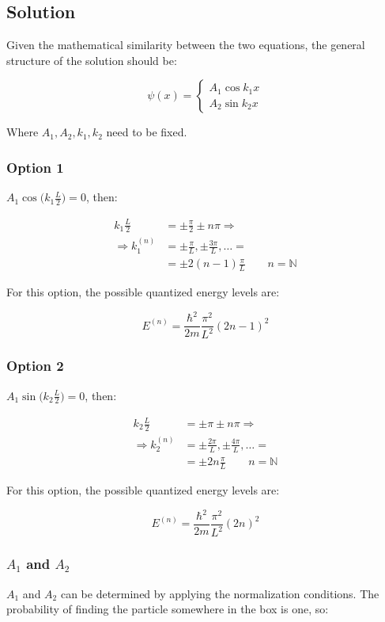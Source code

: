   \subsection{Solution}
  Given the mathematical similarity between the two equations, the general structure of the solution should be:

  $$\psi(x) = \begin{cases}A_1\cos k_1 x \\A_2\sin k_2x\end{cases}$$

  Where $A_1,A_2,k_1, k_2$ need to be fixed.

    \subsubsection{Option 1}
    $A_1\cos\biggl(k_1 \frac{L}{2}\biggr) = 0$, then:

    \begin{align*}
      k_1 \frac{L}{2} &=\pm \frac{\pi}{2}\pm n\pi\Rightarrow\\
      \Rightarrow k_1^{(n)} &=\pm \frac{\pi}{L},\pm \frac{3\pi}{L},\dots =\\
                            &= \pm 2(n-1)\frac{\pi}{L}\qquad n = \mathbb{N}
    \end{align*}

    For this option, the possible quantized energy levels are:

    $$E^{(n)} = \frac{\hbar^2}{2m}\frac{\pi^2}{L^2}(2n-1)^2$$

    \subsubsection{Option 2}
    $A_1\sin\biggl(k_2 \frac{L}{2}\biggr) = 0$, then:

    \begin{align*}
      k_2 \frac{L}{2} &=\pm \pi\pm n\pi\Rightarrow\\
      \Rightarrow k_2^{(n)} &=\pm \frac{2\pi}{L},\pm \frac{4\pi}{L},\dots =\\
                            &= \pm 2n\frac{\pi}{L}\qquad n = \mathbb{N}
    \end{align*}

    For this option, the possible quantized energy levels are:

    $$E^{(n)} = \frac{\hbar^2}{2m}\frac{\pi^2}{L^2}(2n)^2$$

    \subsubsection{$A_1$ and $A_2$}
    $A_1$ and $A_2$ can be determined by applying the normalization conditions.
    The probability of finding the particle somewhere in the box is one, so:

